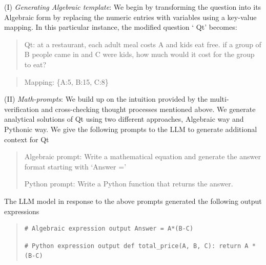 (I) \textit{Generating Algebraic template}: We begin by transforming the question into its Algebraic form by replacing the numeric entries with variables using a key-value mapping. In this particular instance, the modified question `{\color{gray} Qt}' becomes:

\begin{quotation}
     {\color{gray} Qt: \textcolor{example_color}{at a restaurant, each adult meal costs {\textcolor{notation_color}{A}} and kids eat free. if a group of {\textcolor{notation_color}{B}} people came in and {\textcolor{notation_color}{C}} were kids, how much would it cost for the group to eat?}}
\end{quotation}

\begin{quotation}   
    {\color{gray} 
   {Mapping: \{\textcolor{notation_color} {A}:\textcolor{example_color}{5}, \textcolor{notation_color}{B}:\textcolor{example_color}{15}, \textcolor{notation_color}{C}:\textcolor{example_color}{8}}\}
    }
\end{quotation}

(II) \textit{Math-prompts}: We build up on the intuition provided by the multi-verification and cross-checking thought processes mentioned above. We generate analytical solutions of {\color{gray} Qt} using two different approaches, Algebraic way and Pythonic way. We give the following prompts to the LLM to generate additional context for {\color{gray} Qt}

\begin{quotation}
     {\color{gray} Algebraic prompt: \textcolor{example_color}{
     Write a mathematical equation and generate the answer format starting with `Answer =' } }

     {\color{gray} Python prompt: \textcolor{example_color}{
     Write a Python function that returns the answer.} }
\end{quotation}

The LLM model in response to the above prompts generated the following output expressions

\begin{quotation}
\begin{verbatim}
# Algebraic expression output Answer = A*(B-C)  
\end{verbatim}

\begin{verbatim}
# Python expression output def total_price(A, B, C): return A * (B-C)
\end{verbatim}
\end{quotation}


